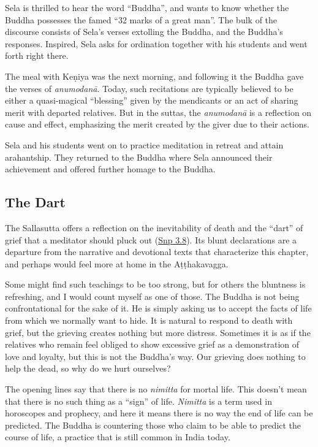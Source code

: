 \documentclass[12pt,openany]{book}%
\begin{document}
Sela is thrilled to hear the word “Buddha”, and wants to know whether the Buddha possesses the famed “32 marks of a great man”. The bulk of the discourse consists of Sela’s verses extolling the Buddha, and the Buddha’s responses. Inspired, Sela asks for ordination together with his students and went forth right there.

The meal with \textsanskrit{Keṇiya} was the next morning, and following it the Buddha gave the verses of \textit{\textsanskrit{anumodanā}}. Today, such recitations are typically believed to be either a quasi-magical “blessing” given by the mendicants or an act of sharing merit with departed relatives. But in the suttas, the \textit{\textsanskrit{anumodanā}} is a reflection on cause and effect, emphasizing the merit created by the giver due to their actions.

Sela and his students went on to practice meditation in retreat and attain arahantship. They returned to the Buddha where Sela announced their achievement and offered further homage to the Buddha.

\subsection*{The Dart}

The Sallasutta offers a reflection on the inevitability of death and the “dart” of grief that a meditator should pluck out (\href{https://suttacentral.net/snp3.8/en/sujato}{Snp 3.8}). Its blunt declarations are a departure from the narrative and devotional texts that characterize this chapter, and perhaps would feel more at home in the \textsanskrit{Aṭṭhakavagga}.

Some might find such teachings to be too strong, but for others the bluntness is refreshing, and I would count myself as one of those. The Buddha is not being confrontational for the sake of it. He is simply asking us to accept the facts of life from which we normally want to hide. It is natural to respond to death with grief, but the grieving creates nothing but more distress. Sometimes it is as if the relatives who remain feel obliged to show excessive grief as a demonstration of love and loyalty, but this is not the Buddha’s way. Our grieving does nothing to help the dead, so why do we hurt ourselves?

The opening lines say that there is no \textit{nimitta} for mortal life. This doesn’t mean that there is no such thing as a “sign” of life. \textit{Nimitta} is a term used in horoscopes and prophecy, and here it means there is no way the end of life can be predicted. The Buddha is countering those who claim to be able to predict the course of life, a practice that is still common in India today.
\end{document}
